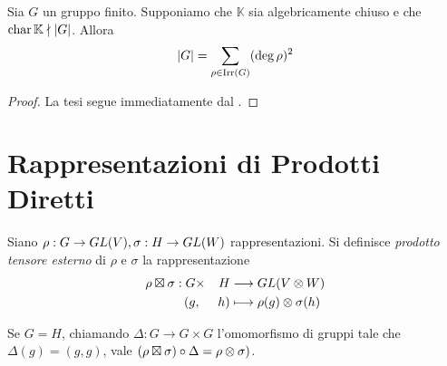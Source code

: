 \begin{corollary}
Sia $G$ un gruppo finito. Supponiamo che $\mathbb{K}$ sia algebricamente chiuso e che $\operatorname{char}\mathbb{K}\nmid |G|$. Allora
$$
|G|=\sum_{\rho\in\operatorname{Irr}(G)}(\deg\rho)^2
$$
\end{corollary}
\begin{proof}
La tesi segue immediatamente dal .
\end{proof}

\section{Rappresentazioni di Prodotti Diretti}

\begin{definition}
Siano $\rho:G\to GL(V),\allowbreak\sigma:H\to GL(W)$ rappresentazioni. Si definisce \emph{prodotto tensore esterno} di $\rho$ e $\sigma$ la rappresentazione
\begin{alignat*}{2}
\rho\boxtimes\sigma:G&\times &H&\longrightarrow GL(V\otimes W)\\
(g&,&h)&\longmapsto\rho(g)\otimes\sigma(h)
\end{alignat*}
\end{definition}

\begin{remark}
Se $G=H$, chiamando $\Delta:G\to G\times G$ l'omomorfismo di gruppi tale che $\Delta(g)=(g,g)$, vale $(\rho\boxtimes\sigma)\circ\Delta=\rho\otimes\sigma)$.
\end{remark}


